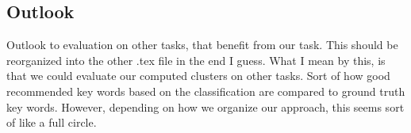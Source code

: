 \subsection{Outlook}
Outlook to evaluation on other tasks, that benefit from our task. This should be reorganized into the other .tex file in the end I guess. What I mean by this, is that we could evaluate our computed clusters on other tasks. Sort of how good recommended key words based on the classification are compared to ground truth key words. However, depending on how we organize our approach, this seems sort of like a full circle.


\newpage %